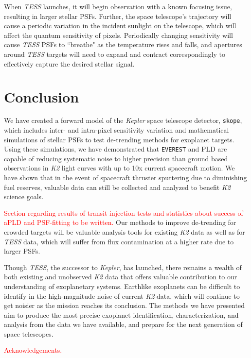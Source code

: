 \documentclass[12pt,preprint]{aastex}
\begin{document}
When \textit{TESS} launches, it will begin observation with a known focusing issue, resulting in larger stellar PSFs. Further, the space telescope's trajectory will cause a periodic variation in the incident sunlight on the telescope, which will affect the quantum sensitivity of pixels. Periodically changing sensitivity will cause \textit{TESS} PSFs to ``breathe" as the temperature rises and falls, and apertures around \textit{TESS} targets will need to expand and contract correspondingly to effectively capture the desired stellar signal.

\section{Conclusion}

We have created a forward model of the \textit{Kepler} space telescope detector, \texttt{skope}, which includes inter- and intra-pixel sensitivity variation and mathematical simulations of stellar PSFs to test de-trending methods for exoplanet targets. Using these simulations, we have demonstrated that \texttt{EVEREST} and PLD are  capable of reducing systematic noise to higher precision than ground based observations in \textit{K2} light curves with up to 10x current spacecraft motion. We have shown that in the event of spacecraft thruster sputtering due to diminishing fuel reserves, valuable data can still be collected and analyzed to benefit \textit{K2} science goals.

\textcolor{red}{Section regarding results of transit injection tests and statistics about success of aPLD and PSF-fitting to be written.} Our methods to improve de-trending for crowded targets will be valuable analysis tools for existing \textit{K2} data as well as for \textit{TESS} data, which will suffer from flux contamination at a higher rate due to larger PSFs.

Though \textit{TESS}, the successor to \textit{Kepler}, has launched, there remains a wealth of both existing and unobserved \textit{K2} data that offers valuable contribution to our understanding of exoplanetary systems. Earthlike exoplanets can be difficult to identify in the high-magnitude noise of current \textit{K2} data, which will continue to get noisier as the mission reaches its conclusion. The methods we have presented aim to produce the most precise exoplanet identification, characterization, and analysis from the data we have available, and prepare for the next generation of space telescopes.

\textcolor{red}{Acknowledgements.}

\clearpage


\end{document}

